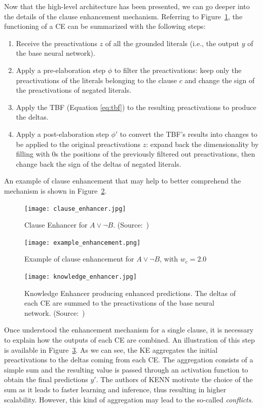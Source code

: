 Now that the high-level architecture has been presented, we can go deeper into the details of the clause enhancement mechanism. Referring to Figure~\ref{fig:clause_enhancer}, the functioning of a CE can be summarized with the following steps:
\begin{enumerate}
    \item Receive the preactivations $ z $ of all the grounded literals (i.e., the output $y$ of the base neural network).
    \item Apply a pre-elaboration step $ \phi $ to filter the preactivations: keep only the preactivations of the literals belonging to the clause $ c $ and change the sign of the preactivations of negated literals.
    \item Apply the TBF (Equation \ref{eq:tbf}) to the resulting preactivations to produce the deltas.
    \item Apply a post-elaboration step $ \phi' $ to convert the TBF’s results into changes to be applied to the original preactivations $ z $: expand back the dimensionality by filling with 0s the positions of the previously filtered out preactivations, then change back the sign of the deltas of negated literals.
\end{enumerate}
An example of clause enhancement that may help to better comprehend the mechanism is shown in Figure~\ref{fig:example_enhancement}. 
\begin{figure}[H]
    \centering
    \texttt{[image: clause\_enhancer.jpg]}
    \caption{Clause Enhancer for $ A \vee \neg B $. (Source:~\cite{kenn})}
    \label{fig:clause_enhancer}
\end{figure}

\begin{figure}[H]
    \centering
    \texttt{[image: example\_enhancement.png]}
    \caption{Example of clause enhancement for $ A \vee \neg B $, with $w_{c}=2.0$}
    \label{fig:example_enhancement}
\end{figure}

\begin{figure}
    \centering
    \texttt{[image: knowledge\_enhancer.jpg]}
    \caption{Knowledge Enhancer producing enhanced predictions. The deltas of each CE are summed to the preactivations of the base neural network. (Source:~\cite{kenn})}
    \label{fig:knowledge_enhancer}
\end{figure}

Once understood the enhancement mechanism for a single clause, it is necessary to explain how the outputs of each CE are combined. An illustration of this step is available in Figure~\ref{fig:knowledge_enhancer}. As we can see, the KE aggregates the initial preactivations to the deltas coming from each CE. The aggregation consists of a simple sum and the resulting value is passed through an activation function to obtain the final predictions $y'$. The authors of KENN motivate the choice of the sum as it leads to faster learning and inference, thus resulting in higher scalability. However, this kind of aggregation may lead to the so-called \textit{conflicts}.


